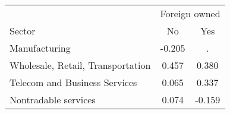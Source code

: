 \begin{tabular}{lcc}
\toprule
 & \multicolumn{2}{c}{Foreign owned} \\
\cmidrule(lr){2-3}
Sector & No & Yes \\
\midrule
Manufacturing & -0.205 & . \\
Wholesale, Retail, Transportation & 0.457 & 0.380 \\
Telecom and Business Services & 0.065 & 0.337 \\
Nontradable services & 0.074 & -0.159 \\
\bottomrule
\end{tabular}
